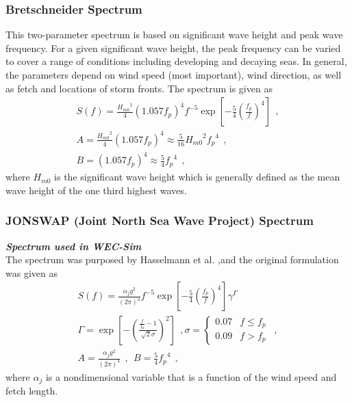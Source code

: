 \subsubsection{Bretschneider Spectrum}
This two-parameter spectrum is based on significant wave height and peak wave frequency.  For a
given significant wave height, the peak frequency can be varied to cover a range of conditions including developing and decaying seas. In general, the parameters depend on wind speed (most important),
wind direction, as well as fetch and locations of storm fronts. The spectrum is given as
\begin{eqnarray}
& S\left( f \right) = \frac{{H_{m0}}^2}{4}\left(1.057f_{p}\right)^{4}f^{-5}\exp\left[-\frac{5}{4} \left( \frac{f_{p}}{f}\right)^{4} \right]~~, &\\
& A =\frac{{H_{m0}}^2}{4}\left(1.057f_{p}\right)^{4} \approx \frac{5}{16} {H_{m0}}^2 {f_{p}}^{4}~~, &\\ 
& B = \left(1.057f_{p}\right)^{4} \approx \frac{5}{4} {f_{p}}^{4}~~, &
\end{eqnarray}
where $H_{m0}$ is the significant wave height which is generally defined as the mean wave height of the one third highest waves.

\subsubsection{JONSWAP (Joint North Sea Wave Project) Spectrum}
\textbf{\textit{Spectrum used in WEC-Sim}}\\
The spectrum was purposed by Hasselmann et al. \cite{HK},and  the original formulation was given as
\begin{eqnarray}
& S\left( f \right) = \frac{ \alpha_{j} g^{2} }{ (2\pi)^{4}} f^{-5}\exp\left[-\frac{5}{4} \left( \frac{f_{p}}{f}\right)^{4} \right]\gamma^\Gamma \nonumber & \\ 
&\Gamma = \exp \left[ -\left( \frac{\frac{f}{f_{p}}-1}{\sqrt{2} \sigma}\right)^{2} \right]~~, \sigma = \begin{cases} 0.07 & f \leq f_{p} \\ 
                                          0.09 & f > f_{p} \end{cases} ~~, &\\
& A =\frac{ \alpha_{j} g^{2} }{ (2\pi)^{4}}~~, ~~ B = \frac{5}{4} {f_{p}}^{4}~~, &
\end{eqnarray}
where $\alpha_{j}$ is a nondimensional variable that is a function of the wind speed and fetch length. 


